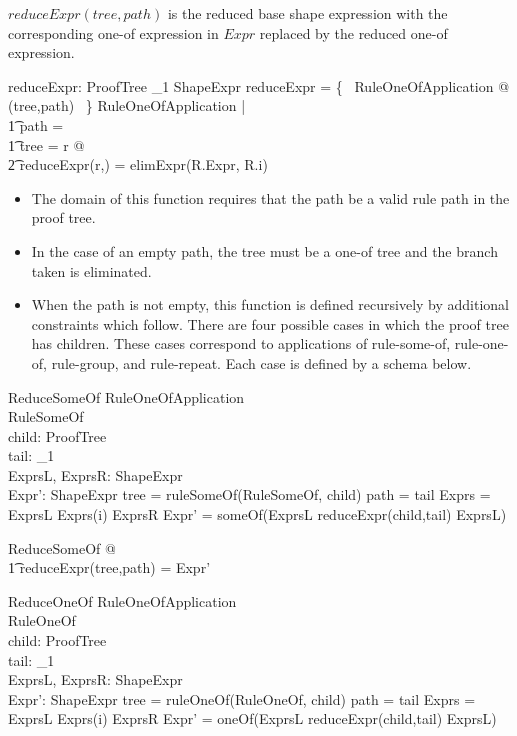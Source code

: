\documentclass{article}
\begin{document}
$reduceExpr(tree,path)$ is the reduced base shape expression with the corresponding one-of expression in $Expr$ replaced by the reduced one-of expression.
\begin{axdef}
	reduceExpr: ProofTree \cross \seq \nat_1 \pfun ShapeExpr
\where
	\dom reduceExpr = \{~ RuleOneOfApplication @ (tree,path) ~\}
\also
	\forall RuleOneOfApplication | \\
\t1		path = \langle \rangle \land \\
\t1		tree = r @ \\
\t2			reduceExpr(r,\langle \rangle) = elimExpr(R.Expr, R.i)
\end{axdef}
\begin{itemize}
\item The domain of this function requires that the path be a valid rule path in the proof tree.
\item In the case of an empty path, the tree must be a one-of tree and the branch taken is eliminated.
\item When the path is not empty, this function is defined recursively by additional constraints which follow.
There are four possible cases in which the proof tree has children. These cases correspond to applications of
rule-some-of, rule-one-of, rule-group, and rule-repeat.
Each case is defined by a schema below.
\end{itemize}

\begin{schema}{ReduceSomeOf}
	RuleOneOfApplication \\
	RuleSomeOf \\
	child: ProofTree \\
	tail: \seq \nat_1 \\
	ExprsL, ExprsR: \seq ShapeExpr \\
	Expr': ShapeExpr
\where
	tree = ruleSomeOf(\theta RuleSomeOf, child)
\also
	path =  \rangle \cat tail
\also
	Exprs = ExprsL \cat \langle Exprs(i) \rangle \cat ExprsR
\also
	Expr' = someOf(ExprsL \cat \langle reduceExpr(child,tail) \rangle \cat ExprsL)
\end{schema}

\begin{zed}
	\forall ReduceSomeOf @ \\
\t1		reduceExpr(tree,path) = Expr'
\end{zed}

\begin{schema}{ReduceOneOf}
	RuleOneOfApplication \\
	RuleOneOf \\
	child: ProofTree \\
	tail: \seq \nat_1 \\
	ExprsL, ExprsR: \seq ShapeExpr \\
	Expr': ShapeExpr
\where
	tree = ruleOneOf(\theta RuleOneOf, child)
\also
	path =  \rangle \cat tail
\also
	Exprs = ExprsL \cat \langle Exprs(i) \rangle \cat ExprsR
\also
	Expr' = oneOf(ExprsL \cat \langle reduceExpr(child,tail) \rangle \cat ExprsL)
\end{schema}
\end{document}
